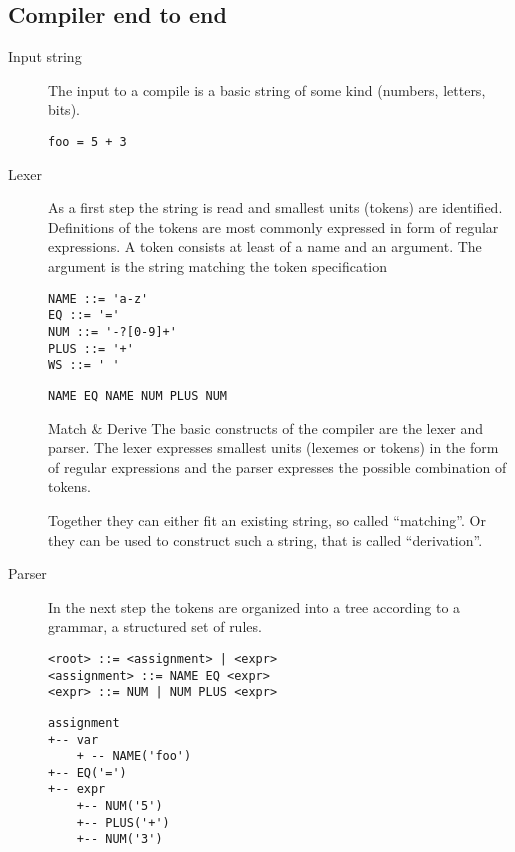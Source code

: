 \documentclass{scrartcl}
\begin{document}
\subsection{Compiler end to end}
\label{sub:compiler_end_to_end}
\begin{description}
    \item[Input string] The input to a compile is a basic string of some kind
        (numbers, letters, bits).

        \begin{lstlisting}[caption=input string]
foo = 5 + 3
        \end{lstlisting}

    \item[Lexer] As a first step the string is read and
        smallest units (tokens) are identified. Definitions of the tokens are
        most commonly expressed in form of regular expressions. A token
        consists at least of a name and an argument. The argument is the string
        matching the token specification

        \begin{lstlisting}[language=bnf, caption=Tokenizer rules]
NAME ::= 'a-z'
EQ ::= '='
NUM ::= '-?[0-9]+'
PLUS ::= '+'
WS ::= ' '
        \end{lstlisting}
        \begin{lstlisting}[caption=Tokenizer output]
NAME EQ NAME NUM PLUS NUM
        \end{lstlisting}

        \begin{info}{Match \& Derive}
The basic constructs of the compiler are the lexer and parser. The lexer
expresses smallest units (lexemes or tokens) in the form of regular
expressions and the parser expresses the possible combination of tokens.

Together they can either fit an existing string, so called ``matching''. Or they
can be used to construct such a string, that is called ``derivation''.
        \end{info}

    \item[Parser] In the next step the tokens are organized into a tree
        according to a grammar, a structured set of rules.

        \begin{lstlisting}[language=bnf, caption=Parser rules]
<root> ::= <assignment> | <expr>
<assignment> ::= NAME EQ <expr>
<expr> ::= NUM | NUM PLUS <expr>
        \end{lstlisting}
        \begin{lstlisting}[language=yangtree, caption=Parser output: Parse tree]
assignment
+-- var
    + -- NAME('foo')
+-- EQ('=')
+-- expr
    +-- NUM('5')
    +-- PLUS('+')
    +-- NUM('3')
        \end{lstlisting}


\end{description}
\end{document}
